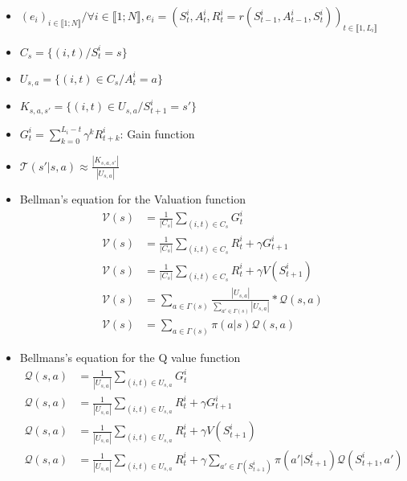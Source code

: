 \documentclass[8pt,a4paper]{extarticle}
\begin{document}
\begin{itemize}

\item
  $(e_i)_{i \in \llbracket 1; N \rrbracket} / \forall i \in \llbracket 1; N \rrbracket, e_i = (S_t^i, A^i_t, R^i_t = r(S_{t-1}^i, A_{t-1}^i, S_t^i))_{t \in \llbracket 1, L_i \rrbracket}$

\item $C_s = \{(i, t)/ S^i_t = s\}$
\item
  $U_{s, a}= \{ (i, t) \in C_s / A_t^i = a\}$
\item
  $K_{s, a , s'}= \{(i, t) \in U_{s, a} / S_{t+1}^i = s'\}$
\item
  $G_t^i = \sum_{k=0}^{L_i - t}\gamma^k R^i_{t+k}$: Gain function
\item
  $\mathcal T(s' | s, a) \approx \frac{|K_{s, a, s'}|}{|U_{s, a}|}$

\item
  Bellman's equation for the Valuation function
  \begin{align}
    \mathcal V(s) &= \frac{1}{|C_s|}\sum_{(i, t) \in C_s}G^i_t \\
    \mathcal V(s) &= \frac{1}{|C_s|}\sum_{(i, t) \in C_s} R^i_t + \gamma G^i_{t+1}  \\
    \mathcal V(s) &= \frac{1}{|C_s|}\sum_{(i, t) \in C_s} R^i_t + \gamma V(S_{t+1}^i) \\
    \mathcal V(s) &= \sum_{a\in \Gamma(s)}\frac{|U_{s, a}|}{\sum_{a'\in \Gamma(s)}|U_{s, a}|}*\mathcal Q(s, a) \\
    \mathcal V(s) &= \sum_{a\in \Gamma(s)} \pi(a | s)\mathcal Q(s, a)
  \end{align}

\item
  Bellmans's equation for the Q value function
  \begin{align}
    \mathcal Q(s, a) &=  \frac{1}{|U_{s, a}|}\sum_{(i, t) \in U_{s, a}}G^i_t \\
    \mathcal Q(s, a) &=  \frac{1}{|U_{s, a}|}\sum_{(i, t) \in U_{s, a}}R^i_t + \gamma G^i_{t+1} \\
    \mathcal Q(s, a) &=  \frac{1}{|U_{s, a}|}\sum_{(i, t) \in U_{s, a}}R^i_t + \gamma V(S_{t+1}^i) \\
    \mathcal Q(s, a) &=  \frac{1}{|U_{s, a}|}\sum_{(i, t) \in U_{s, a}}R^i_t + \gamma \sum_{a'\in \Gamma(S_{t+1}^i)} \pi(a' | S_{t+1}^i)\mathcal Q(S_{t+1}^i, a')
  \end{align}
  
\end{itemize}
\end{document}
